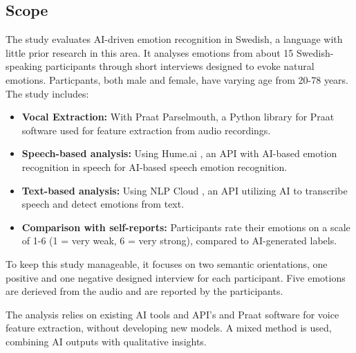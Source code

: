 \subsection{Scope}
The study evaluates AI-driven emotion recognition in Swedish, a language with little prior research in this area. It analyses emotions from about 15 Swedish-speaking participants through short interviews designed to evoke natural emotions. 
Particpants, both male and female, have varying age from 20-78 years. 
The study includes: 
\begin{itemize}
    \item \textbf{Vocal Extraction: } With Praat Parselmouth, a Python library for Praat software used for feature extraction from audio recordings. 
    \item \textbf{Speech-based analysis:} Using Hume.ai \autocite{HumeAI-AboutHume}, an API with AI-based emotion recognition in speech for AI-based speech emotion recognition. 
    \item \textbf{Text-based analysis:} Using NLP Cloud \autocite{NLPCloud}, an API utilizing AI to transcribe speech and detect emotions from text.
    \item \textbf{Comparison with self-reports:} Participants rate their emotions on a scale of 1-6 (1 = very weak, 6 = very strong), compared to AI-generated labels. 
\end{itemize}
To keep this study manageable, it focuses on two semantic orientations, one positive and one negative designed interview for each participant. Five emotions are derieved from the audio and are reported by the participants.

The analysis relies on existing AI tools and API’s \autocite{HumeAI-AboutHume, NLPCloud} and Praat software for voice feature extraction, without developing new models. A mixed method is used, combining AI outputs with qualitative insights.

